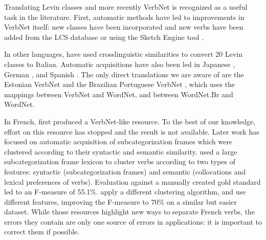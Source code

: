 Translating Levin classes and more recently VerbNet is recognized as a useful
task in the literature. First, automatic methods have led to improvements in
VerbNet itself: new classes have been incorporated
\citep{korhonen2004extended} and new verbs have been added from the LCS
database \citep{dorr2001lcs} or using the Sketch Engine tool
\citep{bonial2013expanding}.

In other languages, \cite{merlo2002multilingual} have used crosslinguistic
similarities to convert 20 Levin classes to Italian. Automatic acquisitions
have also been led in Japanese \citep{suzuki2009classifying}, German
\citep{im2006experiments}, and Spanish \citep{ferrer2004towards}. The
only direct translations we are aware of are the Estonian VerbNet
\citep{jentson2014verbnet} and the Brazilian Portuguese VerbNet
\citep{scarton2012towards}, which uses the mappings between VerbNet and
WordNet, and between WordNet.Br and WordNet.

In French, \cite{saintdizier1996constructing} first produced a VerbNet-like
resource. To the best of our knowledge, effort on this resource has stopped and
the result is not available. Later work has focused on automatic acquisition of
subcategorization frames which were clustered according to their syntactic and
semantic similarity. \cite{sun2010investigating} used a large
subcategorization frame lexicon \citep{messiant2010acquisition} to cluster
verbs according to two types of features: syntactic (subcategorization frames)
and semantic (collocations and lexical preferences of verbs). Evaluation
against a manually created gold standard led to an F-measure of 55.1\%.
\cite{falk2012classifying} apply a different clustering algorithm, and use
different features, improving the F-measure to 70\% on a similar but easier
dataset. While those resources highlight new ways to separate French verbs, the
errors they contain are only one source of errors in applications: it is
important to correct them if possible.


